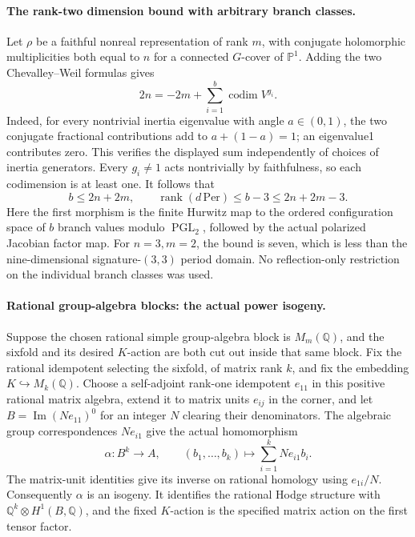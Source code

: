 \paragraph{The rank-two dimension bound with arbitrary branch classes.}
Let $\rho$ be a faithful nonreal representation of rank $m$,
with conjugate holomorphic multiplicities both equal to $n$
for a connected $G$-cover of $\mathbb P^1$. Adding the two
Chevalley--Weil formulas gives
\[
 2n=-2m+\sum_{i=1}^b
                    \operatorname{codim}V^{g_i}.             \tag{I11.3}
\]
Indeed, for every nontrivial inertia eigenvalue with angle
$a\in(0,1)$, the two conjugate fractional contributions add to
$a+(1-a)=1$; an eigenvalue1 contributes zero. This verifies
the displayed sum independently of choices of inertia generators.
Every $g_i\ne1$ acts nontrivially by faithfulness, so each
codimension is at least one. It follows that
\[
 b\le2n+2m,\qquad
 \operatorname{rank}(d\,\mathrm{Per})\le b-3
                                  \le2n+2m-3.              \tag{I11.4}
\]
Here the first morphism is the finite Hurwitz map to the ordered
configuration space of $b$ branch values modulo
$\operatorname{PGL}_2$, followed by the actual polarized Jacobian
factor map. For $n=3,m=2$, the bound is seven, which is less than
the nine-dimensional signature-$(3,3)$ period domain. No
reflection-only restriction on the individual branch classes
was used.

\paragraph{Rational group-algebra blocks: the actual power isogeny.}
Suppose the chosen rational simple group-algebra block is
$M_m(\mathbb Q)$, and the sixfold and its desired $K$-action
are both cut out inside that same block. Fix the rational
idempotent selecting the sixfold, of matrix rank $k$, and fix
the embedding $K\hookrightarrow M_k(\mathbb Q)$.
Choose a self-adjoint rank-one idempotent $e_{11}$ in this
positive rational matrix algebra, extend it to matrix units
$e_{ij}$ in the corner, and let
$B=\operatorname{Im}(Ne_{11})^0$ for an integer $N$ clearing
their denominators. The algebraic group correspondences
$Ne_{i1}$ give the actual homomorphism
\[
 \alpha:B^k\longrightarrow A,\qquad
 (b_1,\ldots,b_k)\longmapsto\sum_{i=1}^k Ne_{i1}b_i.          \tag{I11.5}
\]
The matrix-unit identities give its inverse on rational
homology using $e_{1i}/N$. Consequently $\alpha$ is an isogeny.
It identifies the rational Hodge structure with
$\mathbb Q^k\otimes H^1(B,\mathbb Q)$, and the fixed $K$-action
is the specified matrix action on the first tensor factor.

